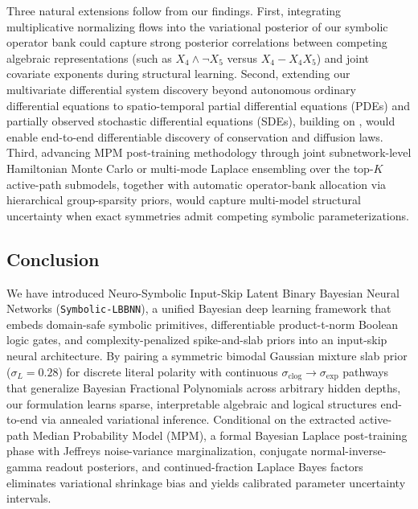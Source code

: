 \documentclass[11pt,a4paper]{article}
\begin{document}
Three natural extensions follow from our findings. First, integrating multiplicative normalizing flows \citep{skaaret2024flows} into the variational posterior of our symbolic operator bank could capture strong posterior correlations between competing algebraic representations (such as $X_4 \land \neg X_5$ versus $X_4 - X_4 X_5$) and joint covariate exponents during structural learning. Second, extending our multivariate differential system discovery beyond autonomous ordinary differential equations to spatio-temporal partial differential equations (PDEs) and partially observed stochastic differential equations (SDEs), building on \citet{hubin2025bgnlm}, would enable end-to-end differentiable discovery of conservation and diffusion laws. Third, advancing MPM post-training methodology through joint subnetwork-level Hamiltonian Monte Carlo or multi-mode Laplace ensembling over the top-$K$ active-path submodels, together with automatic operator-bank allocation via hierarchical group-sparsity priors, would capture multi-model structural uncertainty when exact symmetries admit competing symbolic parameterizations.

\subsection{Conclusion}
\label{sec:conclusion}

We have introduced Neuro-Symbolic Input-Skip Latent Binary Bayesian Neural Networks (\texttt{Symbolic-LBBNN}), a unified Bayesian deep learning framework that embeds domain-safe symbolic primitives, differentiable product-t-norm Boolean logic gates, and complexity-penalized spike-and-slab priors into an input-skip neural architecture. By pairing a symmetric bimodal Gaussian mixture slab prior ($\sigma_L = 0.28$) for discrete literal polarity with continuous $\sigma_{\text{clog}} \to \sigma_{\exp}$ pathways that generalize Bayesian Fractional Polynomials across arbitrary hidden depths, our formulation learns sparse, interpretable algebraic and logical structures end-to-end via annealed variational inference. Conditional on the extracted active-path Median Probability Model (MPM), a formal Bayesian Laplace post-training phase with Jeffreys noise-variance marginalization, conjugate normal-inverse-gamma readout posteriors, and continued-fraction Laplace Bayes factors eliminates variational shrinkage bias and yields calibrated parameter uncertainty intervals.
\end{document}
